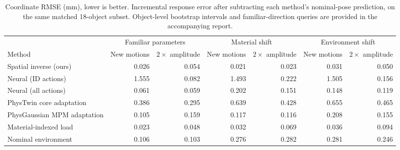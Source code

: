 \begin{table}[t]
\centering\small\setlength{\tabcolsep}{3pt}
\begin{tabular}{lrrrrrr}
\toprule
& \multicolumn{2}{c}{Familiar parameters} & \multicolumn{2}{c}{Material shift} & \multicolumn{2}{c}{Environment shift} \\
Method & New motions & $2\times$ amplitude & New motions & $2\times$ amplitude & New motions & $2\times$ amplitude \\
\midrule
Spatial inverse (ours) & 0.026 & 0.054 & 0.021 & 0.023 & 0.031 & 0.050 \\
Neural (ID actions) & 1.555 & 0.082 & 1.493 & 0.222 & 1.505 & 0.156 \\
Neural (all actions) & 0.061 & 0.059 & 0.202 & 0.151 & 0.148 & 0.119 \\
PhysTwin core adaptation & 0.386 & 0.295 & 0.639 & 0.428 & 0.655 & 0.465 \\
PhysGaussian MPM adaptation & 0.105 & 0.159 & 0.117 & 0.116 & 0.208 & 0.155 \\
Material-indexed load & 0.023 & 0.048 & 0.032 & 0.069 & 0.036 & 0.094 \\
Nominal environment & 0.106 & 0.103 & 0.276 & 0.282 & 0.281 & 0.246 \\
\bottomrule
\end{tabular}
\caption{Coordinate RMSE (mm), lower is better. Incremental response error after subtracting each method's nominal-pose prediction, on the same matched 18-object subset. Object-level bootstrap intervals and familiar-direction queries are provided in the accompanying report.}
\label{tab:incremental}
\end{table}
